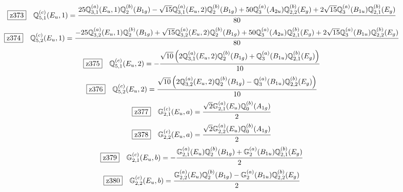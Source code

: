 \documentclass[fleqn,10pt,landscape]{jsarticle}
\begin{document}
\begin{dmath*}
\hspace*{3mm}\fbox{z373}\quad \mathbb{Q}_{5,1}^{(c)}(E_{u},1)=\frac{25 \mathbb{Q}_{3,1}^{(a)}(E_{u},1) \mathbb{Q}_{2}^{(b)}(B_{1g}) - \sqrt{15} \mathbb{Q}_{3,1}^{(a)}(E_{u},2) \mathbb{Q}_{2}^{(b)}(B_{1g}) + 50 \mathbb{Q}_{3}^{(a)}(A_{2u}) \mathbb{Q}_{2,2}^{(b)}(E_{g}) + 2 \sqrt{15} \mathbb{Q}_{3}^{(a)}(B_{1u}) \mathbb{Q}_{2,1}^{(b)}(E_{g})}{80}
\end{dmath*}
\begin{dmath*}
\hspace*{3mm}\fbox{z374}\quad \mathbb{Q}_{5,2}^{(c)}(E_{u},1)=\frac{- 25 \mathbb{Q}_{3,2}^{(a)}(E_{u},1) \mathbb{Q}_{2}^{(b)}(B_{1g}) + \sqrt{15} \mathbb{Q}_{3,2}^{(a)}(E_{u},2) \mathbb{Q}_{2}^{(b)}(B_{1g}) + 50 \mathbb{Q}_{3}^{(a)}(A_{2u}) \mathbb{Q}_{2,1}^{(b)}(E_{g}) + 2 \sqrt{15} \mathbb{Q}_{3}^{(a)}(B_{1u}) \mathbb{Q}_{2,2}^{(b)}(E_{g})}{80}
\end{dmath*}
\begin{dmath*}
\hspace*{3mm}\fbox{z375}\quad \mathbb{Q}_{5,1}^{(c)}(E_{u},2)=- \frac{\sqrt{10} \left(2 \mathbb{Q}_{3,1}^{(a)}(E_{u},2) \mathbb{Q}_{2}^{(b)}(B_{1g}) + \mathbb{Q}_{3}^{(a)}(B_{1u}) \mathbb{Q}_{2,1}^{(b)}(E_{g})\right)}{10}
\end{dmath*}
\begin{dmath*}
\hspace*{3mm}\fbox{z376}\quad \mathbb{Q}_{5,2}^{(c)}(E_{u},2)=\frac{\sqrt{10} \left(2 \mathbb{Q}_{3,2}^{(a)}(E_{u},2) \mathbb{Q}_{2}^{(b)}(B_{1g}) - \mathbb{Q}_{3}^{(a)}(B_{1u}) \mathbb{Q}_{2,2}^{(b)}(E_{g})\right)}{10}
\end{dmath*}
\begin{dmath*}
\hspace*{3mm}\fbox{z377}\quad \mathbb{G}_{2,1}^{(c)}(E_{u},a)=\frac{\sqrt{2} \mathbb{G}_{2,1}^{(a)}(E_{u}) \mathbb{Q}_{0}^{(b)}(A_{1g})}{2}
\end{dmath*}
\begin{dmath*}
\hspace*{3mm}\fbox{z378}\quad \mathbb{G}_{2,2}^{(c)}(E_{u},a)=\frac{\sqrt{2} \mathbb{G}_{2,2}^{(a)}(E_{u}) \mathbb{Q}_{0}^{(b)}(A_{1g})}{2}
\end{dmath*}
\begin{dmath*}
\hspace*{3mm}\fbox{z379}\quad \mathbb{G}_{2,1}^{(c)}(E_{u},b)=- \frac{\mathbb{G}_{2,1}^{(a)}(E_{u}) \mathbb{Q}_{2}^{(b)}(B_{1g}) + \mathbb{G}_{2}^{(a)}(B_{1u}) \mathbb{Q}_{2,1}^{(b)}(E_{g})}{2}
\end{dmath*}
\begin{dmath*}
\hspace*{3mm}\fbox{z380}\quad \mathbb{G}_{2,2}^{(c)}(E_{u},b)=\frac{\mathbb{G}_{2,2}^{(a)}(E_{u}) \mathbb{Q}_{2}^{(b)}(B_{1g}) - \mathbb{G}_{2}^{(a)}(B_{1u}) \mathbb{Q}_{2,2}^{(b)}(E_{g})}{2}
\end{dmath*}
\vspace{5mm}
\end{document}
